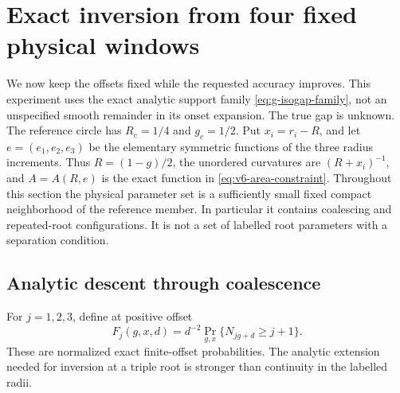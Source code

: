 \section{Exact inversion from four fixed physical windows}
\label{sec:v8-fixed}
We now keep the offsets fixed while the requested accuracy improves.
This experiment uses the exact analytic support family
\eqref{eq:g-isogap-family}, not an unspecified smooth remainder in its
onset expansion. The true gap is unknown. The reference circle has
$R_c=1/4$ and $g_c=1/2$. Put $x_i=r_i-R$, and let $e=(e_1,e_2,e_3)$
be the elementary symmetric functions of the three radius increments.
Thus $R=(1-g)/2$, the unordered curvatures are $(R+x_i)^{-1}$, and
$A=A(R,e)$ is the exact function in \eqref{eq:v6-area-constraint}.
Throughout this section the physical parameter set is a sufficiently
small fixed compact neighborhood of the reference member. In particular
it contains coalescing and repeated-root configurations. It is not a
set of labelled root parameters with a separation condition.

\subsection{Analytic descent through coalescence}
For $j=1,2,3$, define at positive offset
\[
 F_j(g,x,d)=d^{-2}\Pr_{g,x}\{N_{jg+d}\ge j+1\}.
\]
These are normalized exact finite-offset probabilities. The analytic
extension needed for inversion at a triple root is stronger than
continuity in the labelled radii.

